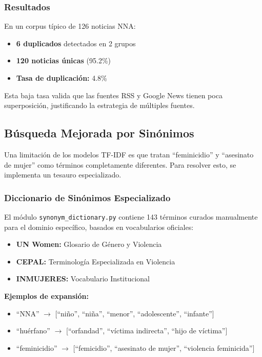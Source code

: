 \subsubsection{Resultados}
\label{subsubsec:mt_resultados_duplicados}

En un corpus típico de 126 noticias NNA:
\begin{itemize}
    \item \textbf{6 duplicados} detectados en 2 grupos
    \item \textbf{120 noticias únicas} (95.2\%)
    \item \textbf{Tasa de duplicación:} 4.8\%
\end{itemize}

Esta baja tasa valida que las fuentes RSS y Google News tienen poca superposición, justificando la estrategia de múltiples fuentes.

\subsection{Búsqueda Mejorada por Sinónimos}
\label{subsec:sinonimos}

Una limitación de los modelos TF-IDF es que tratan ``feminicidio'' y ``asesinato de mujer'' como términos completamente diferentes. Para resolver esto, se implementa un tesauro especializado.

\subsubsection{Diccionario de Sinónimos Especializado}
\label{subsubsec:diccionario_sinonimos}

El módulo \texttt{synonym\_dictionary.py} contiene 143 términos curados manualmente para el dominio específico, basados en vocabularios oficiales:

\begin{itemize}
    \item \textbf{UN Women:} Glosario de Género y Violencia
    \item \textbf{CEPAL:} Terminología Especializada en Violencia
    \item \textbf{INMUJERES:} Vocabulario Institucional
\end{itemize}

\textbf{Ejemplos de expansión:}
\begin{itemize}
    \item ``NNA'' $\rightarrow$ [``niño'', ``niña'', ``menor'', ``adolescente'', ``infante'']
    \item ``huérfano'' $\rightarrow$ [``orfandad'', ``víctima indirecta'', ``hijo de víctima'']
    \item ``feminicidio'' $\rightarrow$ [``femicidio'', ``asesinato de mujer'', ``violencia feminicida'']
\end{itemize}

